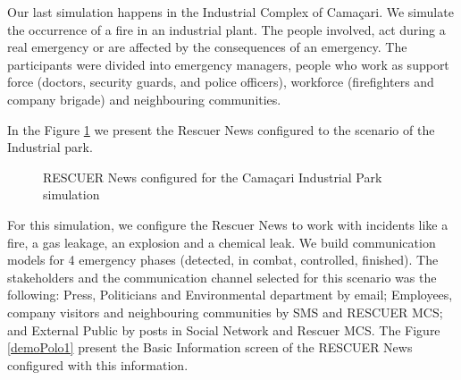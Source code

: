 Our last simulation happens in the Industrial Complex of Cama\c{c}ari. We simulate the occurrence of a fire in an industrial plant. The people involved, act during a real emergency or are affected by the consequences of an emergency. The participants were divided into emergency managers, people who work as support force (doctors, security guards, and police officers), workforce (firefighters and company brigade) and neighbouring communities. 

In the Figure \ref{demoPolo} we present the Rescuer News configured to the scenario of the Industrial park. 

\begin{figure}[h]
\centering
{}
\quad %
\caption{RESCUER News configured for the Cama\c{c}ari Industrial Park simulation}
\label{demoPolo}
\end{figure}

For this simulation, we configure the Rescuer News to work with incidents like a fire, a gas leakage, an explosion and a chemical leak. We build communication models for 4 emergency phases (detected, in combat, controlled, finished). The stakeholders and the communication channel selected for this scenario was the following: Press, Politicians and Environmental department by email; Employees, company visitors and neighbouring communities by SMS and RESCUER MCS; and External Public by posts in Social Network and Rescuer MCS. The Figure \ref{demoPolo1} present the Basic Information screen of the RESCUER News configured with this information.


